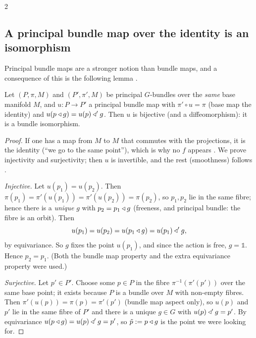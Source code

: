 \begin{paracol}{2}
\subsection{A principal bundle map over the identity is an isomorphism}\label{sec:pb-lemma}
Principal bundle maps are a stronger notion than bundle maps, and a consequence of this is the following lemma  .
\begin{lemma}\label{lem:pb-iso}
Let $(P,\pi,M)$ and $(P',\pi',M)$ be principal $G$-bundles over the \emph{same} base manifold $M$, and $u\colon P\to P'$ a principal bundle map with $\pi'\circ u=\pi$ (base map the identity) and $u(p\mathbin{\triangleleft} g)=u(p)\mathbin{\triangleleft}'g$. Then $u$ is bijective (and a diffeomorphism): it is a bundle isomorphism.     
\end{lemma}
\begin{proof}
If one has a map from $M$ to $M$ that commutes with the projections, it is the identity (``we go to the same point''), which is why no $f$ appears . We prove injectivity and surjectivity; then $u$ is invertible, and the rest (smoothness) follows  .\par
\emph{Injective.} Let $u(p_1)=u(p_2)$. Then $\pi(p_1)=\pi'(u(p_1))=\pi'(u(p_2))=\pi(p_2)$, so $p_1,p_2$ lie in the same fibre; hence there is a \emph{unique} $g$ with $p_2=p_1\mathbin{\triangleleft} g$ (freeness, and principal bundle: the fibre is an orbit). Then
\[
  u(p_1)=u(p_2)=u(p_1\mathbin{\triangleleft} g)=u(p_1)\mathbin{\triangleleft}'g ,
\]
by equivariance. So $g$ fixes the point $u(p_1)$, and since the action is free, $g=\mathbb 1$. Hence $p_2=p_1$. (Both the bundle map property and the extra equivariance property were used.)               \par
\emph{Surjective.} Let $p'\in P'$. Choose some $p\in P$ in the fibre $\pi^{-1}(\pi'(p'))$ over the same base point; it exists because $P$ is a bundle over $M$ with non-empty fibres. Then $\pi'(u(p))=\pi(p)=\pi'(p')$ (bundle map aspect only), so $u(p)$ and $p'$ lie in the same fibre of $P'$ and there is a unique $g\in G$ with $u(p)\mathbin{\triangleleft}'g=p'$. By equivariance $u(p\mathbin{\triangleleft} g)=u(p)\mathbin{\triangleleft}'g=p'$, so $\tilde p:=p\mathbin{\triangleleft} g$ is the point we were looking for.                 

\end{proof}
\end{paracol}
